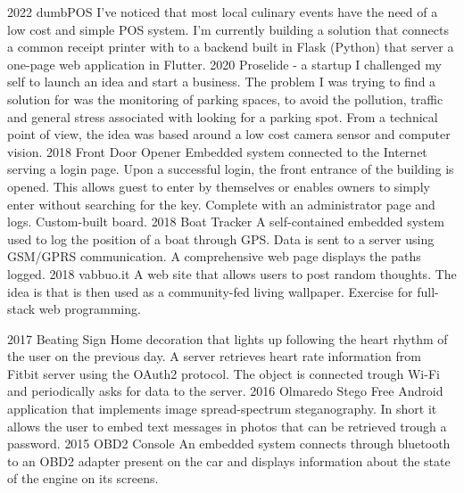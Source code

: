 \documentclass[]{friggeri-cv}
\begin{document}
\begin{entrylist}
  \entry
	{2022}
	{dumbPOS}
	{}
	{I've noticed that most local culinary events have the need of a low cost and simple POS system. I'm currently building a solution that connects a common receipt printer with to a backend built in Flask (Python) that server a one-page web application in Flutter. }
	\entry
	{2020}
	{Proselide - a startup}
	{}
	{I challenged my self to launch an idea and start a business. The problem I was trying to find a solution for was the monitoring of parking spaces, to avoid the pollution, traffic and general stress associated with looking for a parking spot. From a technical point of view, the idea was based around a low cost camera sensor and computer vision.}
	\entry
	{2018}
	{Front Door Opener}
	{}
	{Embedded system connected to the Internet serving a login page. Upon a successful login, the front entrance of the building is opened. This allows guest to enter by themselves or enables owners to simply enter without searching  for the key. Complete with an administrator page and logs. Custom-built board.}
  \entry
  {2018}
  {Boat Tracker}
  {}
  {A self-contained embedded system used to log the position of a boat through GPS. Data is sent to a server using GSM/GPRS communication. A comprehensive web page displays the paths logged.}
  \entry
  {2018}
  {vabbuo.it}
  {}
  {A web site that allows users to post random thoughts. The idea is that is then used as a community-fed living wallpaper. Exercise for full-stack web programming.}
\end{entrylist}
\begin{entrylist}
	\entry	
	{2017}
	{Beating Sign}
	{}
	{Home decoration that lights up following the heart rhythm of the user on the previous day. A server retrieves heart rate information from Fitbit server using the OAuth2 protocol. The object is connected trough Wi-Fi and periodically asks for data to the server.}	
	\entry
	{2016}
	{Olmaredo Stego}
	{}
	{Free Android application that implements image spread-spectrum steganography. In short it allows the user to embed text messages in photos that can be retrieved trough a password.}
	\entry
	{2015}
	{OBD2 Console}
	{}
	{An embedded system connects through bluetooth to an OBD2 adapter present on the car and displays information about the state of the engine on its screens.}	
\end{entrylist}
	
\end{document}
